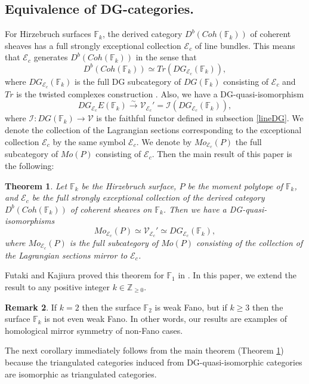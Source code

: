 \documentclass[12pt,reqno]{amsart}
\newcommand{\Z}{{\mathbb{Z}}}
\newcommand{\F}{{\mathbb{F}}}
\newcommand{\Fk}{{\F_k}}
\newcommand{\cE}{{\mathcal{E}}}
\newcommand{\cI}{{\mathcal{I}}}
\newcommand{\cV}{{\mathcal{V}}}
\newtheorem{thm}{Theorem}[section]
\theoremstyle{definition}
\newtheorem{rem}[thm]{Remark}%
\begin{document}
\subsection{Equivalence of DG-categories.}\label{plan}
For Hirzebruch surfaces $\Fk$, the derived category $D^b(Coh(\Fk))$ of coherent sheaves has a full strongly exceptional collection $\cE_c$ of line bundles\cite{hille-perling11,EL}. This means that $\cE_c$ generates $D^b(Coh(\Fk))$ in the sense that
\begin{equation*}
D^b(Coh(\Fk)) \simeq Tr(DG_{\cE_c}(\Fk)),
\end{equation*}
where $DG_{\cE_c}(\Fk)$ is the full DG subcategory of $DG(\Fk)$ consisting of $\cE_c$ and $Tr$ is the twisted complexes construction \cite{BK,kon94}. Also, we have a DG-quasi-isomorphism
\begin{equation*}
DG_{\cE_c}E(\Fk)\overset{\sim}\to\cV_{\cE_c}'=\cI(DG_{\cE_c}(\Fk)),
\end{equation*}
where $\cI:DG(\Fk)\to\cV$ is the faithful functor defined in subsection \ref{lineDG}. We denote the collection of the Lagrangian sections corresponding to the exceptional collection $\cE_c$ by the same symbol $\cE_c$. We denote by $Mo_{\cE_c}(P)$ the full subcategory of $Mo(P)$ consisting of $\cE_c$. Then the main result of this paper is the following:
\begin{thm}\label{main}
Let $\Fk$ be the Hirzebruch surface, $P$ be the moment polytope of $\Fk$, and $\cE_c$ be the full strongly exceptional collection of the derived category $D^b(Coh(\Fk))$ of coherent sheaves on $\Fk$.
Then we have a DG-quasi-isomorphisms
\begin{equation*}
Mo_{\cE_c}(P) \simeq \cV_{\cE_c}' \simeq DG_{\cE_c}(\Fk),
\end{equation*}
where $Mo_{\cE_c}(P)$ is the full subcategory of $Mo(P)$ consisting of the collection of the Lagrangian sections mirror to $\cE_c$.
\end{thm}

Futaki and Kajiura proved this theorem for $\F_1$ in \cite{fut-kaj2}. In this paper, we extend the result to any positive integer $k\in\Z_{\geq0}$.
\begin{rem}
If $k=2$ then the surface $\F_2$ is weak Fano, but if $k\geq3$ then the surface $\Fk$ is not even weak Fano. In other words, our results are examples of homological mirror symmetry of non-Fano cases.
\end{rem}
The next corollary immediately follows from the main theorem (Theorem \ref{main}) because the triangulated categories induced from DG-quasi-isomorphic categories are isomorphic as triangulated categories.
\end{document}
